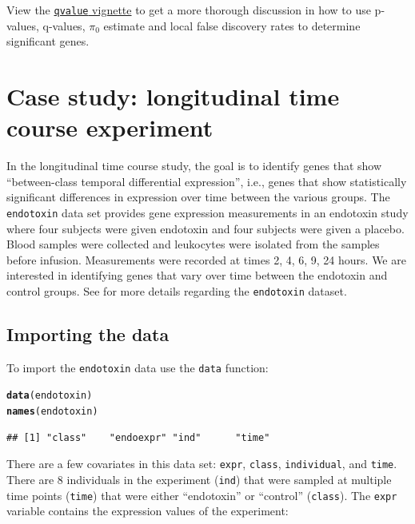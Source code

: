 \documentclass{article}\usepackage[]{graphicx}\usepackage[]{color}
\makeatletter
\newcommand{\hlstd}[1]{\textcolor[rgb]{0.345,0.345,0.345}{#1}}%
\newcommand{\hlkwd}[1]{\textcolor[rgb]{0.737,0.353,0.396}{\textbf{#1}}}%
\newenvironment{kframe}{%
 \def\at@end@of@kframe{}%
 \ifinner\ifhmode%
  \def\at@end@of@kframe{\end{minipage}}%
  \begin{minipage}{\columnwidth}%
 \fi\fi%
 \def\FrameCommand##1{\hskip\@totalleftmargin \hskip-\fboxsep
 \colorbox{shadecolor}{##1}\hskip-\fboxsep
     \hskip-\linewidth \hskip-\@totalleftmargin \hskip\columnwidth}%
 \MakeFramed {\advance\hsize-\width
   \@totalleftmargin\z@ \linewidth\hsize
   \@setminipage}}%
 {\par\unskip\endMakeFramed%
 \at@end@of@kframe}
\newenvironment{knitrout}{}{} %
\makeatother
\begin{document}
View the \href{http://www.bioconductor.org/packages/release/bioc/html/qvalue.html}{{\tt qvalue} vignette} to get a more thorough discussion in how to use p-values, q-values, $\pi_{0}$ estimate and local false discovery rates to determine significant genes.

\section{Case study: longitudinal time course experiment}
\label{sec:endotoxin}
In the longitudinal time course study, the goal is to identify genes that show ``between-class temporal differential expression'', i.e., genes that show statistically significant differences in expression over time between the various groups. The {\tt endotoxin} data set provides gene expression measurements in an endotoxin study where four subjects were given endotoxin and four subjects were given a placebo. Blood samples were collected and leukocytes were isolated from the samples before infusion. Measurements were recorded at times 2, 4, 6, 9, 24 hours. We are interested in identifying genes that vary over time between the endotoxin and control groups. See \cite{calvano:2005} for more details regarding the {\tt endotoxin} dataset.

\subsection{Importing the data}
To import the {\tt endotoxin} data use the {\tt data} function:
\begin{knitrout}
\color{fgcolor}\begin{kframe}
\begin{alltt}
\hlkwd{data}\hlstd{(endotoxin)}
\hlkwd{names}\hlstd{(endotoxin)}
\end{alltt}
\begin{verbatim}
## [1] "class"    "endoexpr" "ind"      "time"
\end{verbatim}
\end{kframe}
\end{knitrout}

There are a few covariates in this data set: {\tt expr}, {\tt class}, {\tt individual}, and {\tt time}. There are 8 individuals in the experiment ({\tt ind}) that were sampled at multiple time points ({\tt time}) that were either ``endotoxin'' or ``control'' ({\tt class}). The {\tt expr} variable contains the expression values of the experiment:
\end{document}
